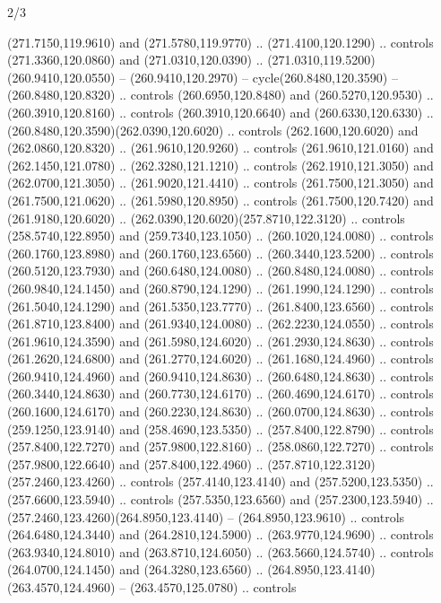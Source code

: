 \begin{flagdescription}{2/3}
\begin{scope}[xshift=0.5\flaglength,yshift=0.5\flagwidth,scale=\flagwidth/259.2]
\begin{scope}[y=0.8pt, x=0.8pt, yscale=-1,shift={(-243,-162)}]
      (271.7150,119.9610) and (271.5780,119.9770) .. (271.4100,120.1290) .. controls
      (271.3360,120.0860) and (271.0310,120.0390) ..
      (271.0310,119.5200)(260.9410,120.0550) -- (260.9410,120.2970) --
      cycle(260.8480,120.3590) -- (260.8480,120.8320) .. controls
      (260.6950,120.8480) and (260.5270,120.9530) .. (260.3910,120.8160) .. controls
      (260.3910,120.6640) and (260.6330,120.6330) ..
      (260.8480,120.3590)(262.0390,120.6020) .. controls (262.1600,120.6020) and
      (262.0860,120.8320) .. (261.9610,120.9260) .. controls (261.9610,121.0160) and
      (262.1450,121.0780) .. (262.3280,121.1210) .. controls (262.1910,121.3050) and
      (262.0700,121.3050) .. (261.9020,121.4410) .. controls (261.7500,121.3050) and
      (261.7500,121.0620) .. (261.5980,120.8950) .. controls (261.7500,120.7420) and
      (261.9180,120.6020) .. (262.0390,120.6020)(257.8710,122.3120) .. controls
      (258.5740,122.8950) and (259.7340,123.1050) .. (260.1020,124.0080) .. controls
      (260.1760,123.8980) and (260.1760,123.6560) .. (260.3440,123.5200) .. controls
      (260.5120,123.7930) and (260.6480,124.0080) .. (260.8480,124.0080) .. controls
      (260.9840,124.1450) and (260.8790,124.1290) .. (261.1990,124.1290) .. controls
      (261.5040,124.1290) and (261.5350,123.7770) .. (261.8400,123.6560) .. controls
      (261.8710,123.8400) and (261.9340,124.0080) .. (262.2230,124.0550) .. controls
      (261.9610,124.3590) and (261.5980,124.6020) .. (261.2930,124.8630) .. controls
      (261.2620,124.6800) and (261.2770,124.6020) .. (261.1680,124.4960) .. controls
      (260.9410,124.4960) and (260.9410,124.8630) .. (260.6480,124.8630) .. controls
      (260.3440,124.8630) and (260.7730,124.6170) .. (260.4690,124.6170) .. controls
      (260.1600,124.6170) and (260.2230,124.8630) .. (260.0700,124.8630) .. controls
      (259.1250,123.9140) and (258.4690,123.5350) .. (257.8400,122.8790) .. controls
      (257.8400,122.7270) and (257.9800,122.8160) .. (258.0860,122.7270) .. controls
      (257.9800,122.6640) and (257.8400,122.4960) ..
      (257.8710,122.3120)(257.2460,123.4260) .. controls (257.4140,123.4140) and
      (257.5200,123.5350) .. (257.6600,123.5940) .. controls (257.5350,123.6560) and
      (257.2300,123.5940) .. (257.2460,123.4260)(264.8950,123.4140) --
      (264.8950,123.9610) .. controls (264.6480,124.3440) and (264.2810,124.5900) ..
      (263.9770,124.9690) .. controls (263.9340,124.8010) and (263.8710,124.6050) ..
      (263.5660,124.5740) .. controls (264.0700,124.1450) and (264.3280,123.6560) ..
      (264.8950,123.4140)(263.4570,124.4960) -- (263.4570,125.0780) .. controls

\end{scope}
\end{scope}
\end{flagdescription}
